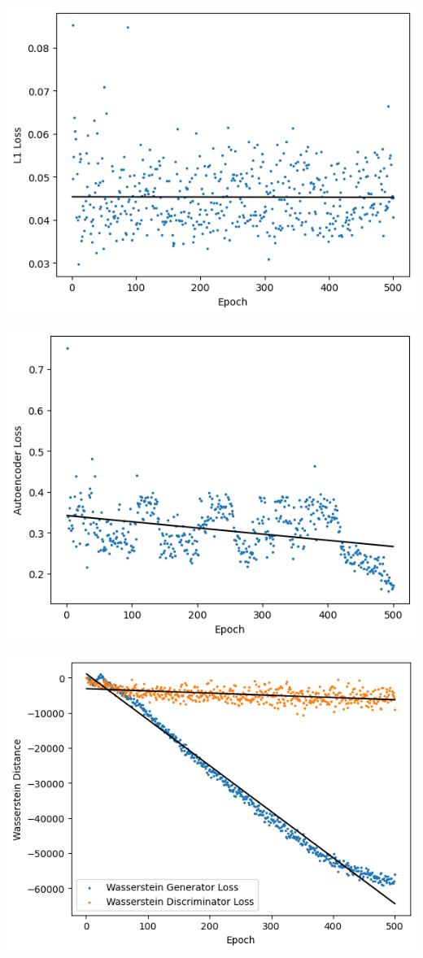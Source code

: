 \documentclass[twocolumn]{article}
\begin{document}
\begin{center}
\includegraphics[width=.9\linewidth]{images/l1_loss.png}
\end{center}

\begin{center}
\includegraphics[width=.9\linewidth]{images/ae_loss.png}
\end{center}

\begin{center}
\includegraphics[width=.9\linewidth]{images/wasserstein_loss.png}
\end{center}
\end{document}
